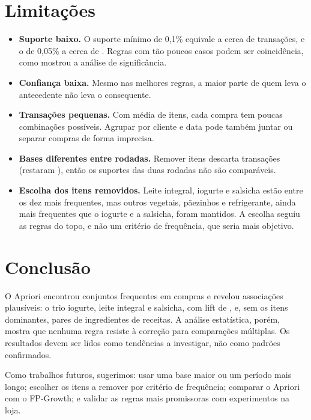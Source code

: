 \documentclass[11pt,a4paper]{article}
\begin{document}
\section{Limitações}

\begin{itemize}
  \item \textbf{Suporte baixo.} O suporte mínimo de 0,1\% equivale a cerca de \MinComprasRUm{} transações, e o de 0,05\% a cerca de \MinComprasRDois. Regras com tão poucos casos podem ser coincidência, como mostrou a análise de significância.
  \item \textbf{Confiança baixa.} Mesmo nas melhores regras, a maior parte de quem leva o antecedente não leva o consequente.
  \item \textbf{Transações pequenas.} Com média de \MediaItens{} itens, cada compra tem poucas combinações possíveis. Agrupar por cliente e data pode também juntar ou separar compras de forma imprecisa.
  \item \textbf{Bases diferentes entre rodadas.} Remover itens descarta transações (restaram \NumComprasRDois), então os suportes das duas rodadas não são comparáveis.
  \item \textbf{Escolha dos itens removidos.} Leite integral, iogurte e salsicha estão entre os dez mais frequentes, mas outros vegetais, pãezinhos e refrigerante, ainda mais frequentes que o iogurte e a salsicha, foram mantidos. A escolha seguiu as regras do topo, e não um critério de frequência, que seria mais objetivo.
\end{itemize}

\section{Conclusão}

O Apriori encontrou \NumFrequentesRUm{} conjuntos frequentes em \NumCompras{} compras e revelou associações plausíveis: o trio iogurte, leite integral e salsicha, com lift de \MelhorLift, e, sem os itens dominantes, pares de ingredientes de receitas. A análise estatística, porém, mostra que nenhuma regra resiste à correção para comparações múltiplas. Os resultados devem ser lidos como tendências a investigar, não como padrões confirmados.

Como trabalhos futuros, sugerimos: usar uma base maior ou um período mais longo; escolher os itens a remover por critério de frequência; comparar o Apriori com o FP-Growth; e validar as regras mais promissoras com experimentos na loja.
\end{document}
